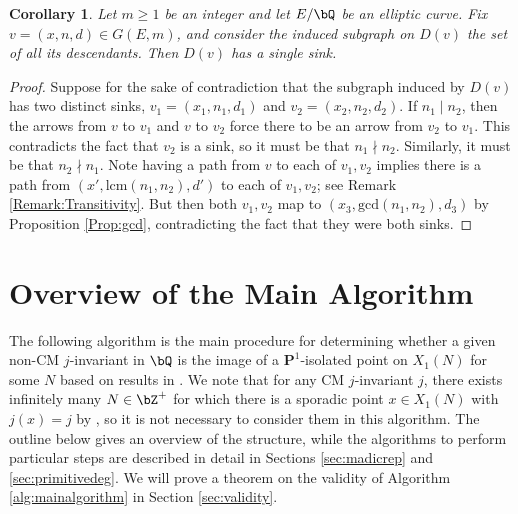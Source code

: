 \documentclass[11pt,reqno]{amsart}
\theoremstyle{plain}
\newtheorem{corollary}[theorem]{Corollary}
\theoremstyle{definition}
\newcommand{\Q}{\bQ}
\newcommand{\Z}{\bZ}
\newcommand{\PP}{\mathbf P}
\newcommand{\abbey}[1]{\textcolor{blue}{Abbey: #1}}
\newcommand{\abedit}[1]{{\color{blue} #1}}
\newcommand{\sedit}[1]{{\color{purple} #1}}
\begin{document}
\begin{corollary}
Let $m\geq 1$ be an integer and let $E/\Q$ be an elliptic curve. Fix $v=(x,n,d)\in G(E,m)$, and consider the \sedit{induced} subgraph \sedit{on} $D(v)$ \sedit{the set} of all its descendants. Then $D(v)$ has a single sink.
\end{corollary}

\begin{proof}
Suppose for the sake of contradiction that \sedit{the subgraph induced by} $D(v)$ has two distinct sinks, $v_1=(x_1,n_1,d_1)$ and $v_2=(x_2,n_2,d_2)$. \abedit{If $n_1 \mid n_2$, then the arrows from $v$ to $v_1$ and $v$ to $v_2$ force there to be an arrow from $v_2$ to $v_1$. This contradicts the fact that $v_2$ is a sink, so it must be that $n_1 \nmid n_2$. Similarly, it must be that $n_2 \nmid n_1$. Note} having a path from $v$ to each of $v_1,v_2$ implies there is a path from $(x',\text{lcm}(n_1,n_2),d')$ to each of $v_1,v_2$; see Remark \ref{Remark:Transitivity}. But then both $v_1,v_2$ map to $(x_3,\text{gcd}(n_1,n_2),d_3)$ by Proposition \ref{Prop:gcd}, contradicting the fact that they were both sinks.
\end{proof}


\section{Overview of the Main Algorithm}
\label{sec:mainalg}
The following algorithm is the main procedure for determining whether a given non-CM $j$-invariant in $\Q$ is the image of a $\PP^1$-isolated point on $X_1(N)$ for some $N$ based on results in \cite{BELOV,ZywinaAlgorithm}. We note that for any CM $j$-invariant $j$, there exists infinitely many $N\in\Z^+$ for which there is a sporadic point $x\in X_1(N)$ with $j(x)=j$ by \cite[Theorem 7.1]{BELOV}, so it is not necessary to consider them in this algorithm. The outline below gives an overview of the structure, while the algorithms to perform particular steps are described in detail in Sections \ref{sec:madicrep} and \ref{sec:primitivedeg}. We will prove a theorem on the validity of Algorithm \ref{alg:mainalgorithm} in Section \ref{sec:validity}.
\end{document}
